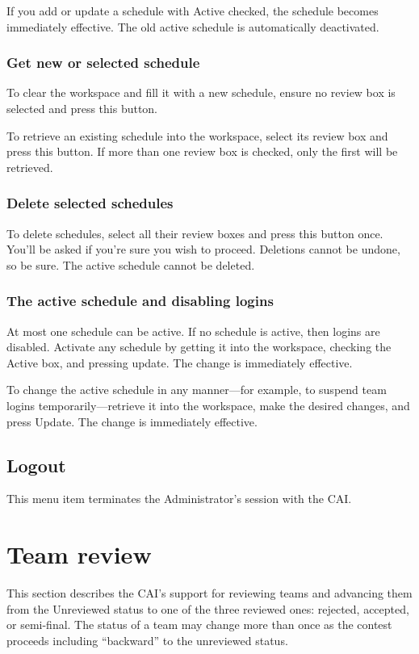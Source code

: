\documentclass[11pt,letterpaper]{refart}
\def\ui#1{\textsf{#1}}
\begin{document}
If you add or update a schedule with \ui{Active} checked, the schedule becomes
immediately effective. The old active schedule is automatically deactivated.

\subsubsection{Get new or selected schedule}
To clear the workspace and fill it with a new schedule, ensure no 
review box is selected and press this button.

To retrieve an existing schedule into the workspace, select 
its review box and press this button. If more than one review box is
checked, only the first will be retrieved. 

\subsubsection{Delete selected schedules}
To delete schedules, select all their review boxes and press this button
once. You'll be asked if you're sure you wish to proceed. Deletions cannot
be undone, so be sure. The active schedule cannot be deleted.

\subsubsection{The active schedule and disabling logins}
At most one schedule can be active. If no schedule is active, then logins are disabled.
Activate any schedule by getting it into the workspace, checking the \ui{Active} box,
and pressing \ui{update}. The change is immediately effective.

To change the active schedule in any manner---for example, to suspend team logins
temporarily---retrieve it into the workspace, make the desired changes, and press
\ui{Update}. The change is immediately effective.

\subsection{Logout}
This menu item terminates the Administrator's session with the CAI.

\section{Team review}
This section describes the CAI's support for reviewing teams and advancing
them from the Unreviewed status to one of the three reviewed ones: rejected,
accepted, or semi-final. The status of a team may change more than once as
the contest proceeds including ``backward'' to the unreviewed status.
\end{document}
